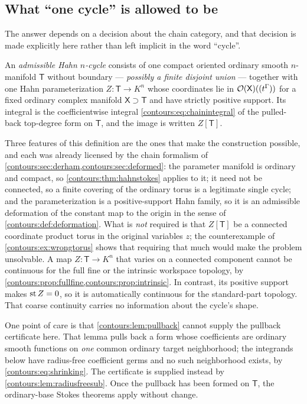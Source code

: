 \documentclass[11pt,letterpaper]{article}
\theoremstyle{definition}
\theoremstyle{remark}
\numberwithin{equation}{section}
\begin{document}
\subsection{What ``one cycle'' is allowed to be}
\label{contours:subsec:onecycle}
The answer depends on a decision about the chain category, and that decision is
made explicitly here rather than left implicit in the word ``cycle''.

\begin{definition}
\label{contours:def:hahncycle}
An \emph{admissible Hahn $n$-cycle} consists of one compact oriented ordinary
smooth $n$-manifold $\mathsf T$ without boundary --- \emph{possibly a finite
disjoint union} --- together with one Hahn parameterization
$Z:\mathsf T\to K^n$ whose coordinates lie in
$\mathcal O(\mathsf X)((t^\Gamma))$ for a fixed ordinary complex manifold
$\mathsf X\supset\mathsf T$ and have strictly positive support. Its integral is
the coefficientwise integral \eqref{contours:eq:chainintegral} of the pulled-back
top-degree form on $\mathsf T$, and the image is written $Z[\mathsf T]$.
\end{definition}

Three features of this definition are the ones that make the construction
possible, and each was already licensed by the chain formalism of
\cref{contours:sec:derham,contours:sec:deformed}: the parameter manifold is
ordinary and compact, so \cref{contours:thm:hahnstokes} applies to it; it need
not be connected, so a finite covering of the ordinary torus is a legitimate
single cycle; and the parameterization is a positive-support Hahn family, so it
is an admissible deformation of the constant map to the origin in the sense of
\cref{contours:def:deformation}. What is \emph{not} required is that
$Z[\mathsf T]$ be a connected coordinate product torus in the original
variables $z$; the counterexample of \cref{contours:ex:wrongtorus} shows that
requiring that much would make the problem unsolvable. A map
$Z:\mathsf T\to K^n$ that varies on a connected component cannot be continuous
for the full fine or the intrinsic workspace topology, by
\cref{contours:prop:fullfine,contours:prop:intrinsic}. In contrast, its positive
support makes $\operatorname{st} Z=0$, so it is automatically continuous for the standard-part
topology. That coarse continuity carries no information about the cycle's shape.

One point of care is that \cref{contours:lem:pullback} cannot supply the
pullback certificate here. That lemma pulls back a form whose coefficients are
ordinary smooth functions on \emph{one} common ordinary target neighborhood; the
integrands below have radius-free coefficient germs and no such neighborhood
exists, by \eqref{contours:eq:shrinking}. The certificate is supplied instead by
\cref{contours:lem:radiusfreesub}. Once the pullback has been formed on
$\mathsf T$, the ordinary-base Stokes theorems apply without change.
\end{document}
